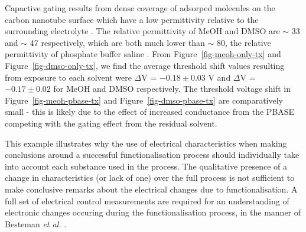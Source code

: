 \documentclass[
  a4paper,
]{scrbook}
\begin{document}
Capactive gating results from dense coverage of adsorped molecules on
the carbon nanotube surface which have a low permittivity relative to
the surrounding electrolyte \autocite{Heller2008}. The relative
permittivity of MeOH and DMSO are \(\sim\) 33 \autocite{Mohsen-Nia2010}
and \(\sim\) 47 \autocite{Hunger2010} respectively, which are both much
lower than \(\sim\) 80, the relative permittivity of phosphate buffer
saline \autocite{Salmanzadeh2013}. From Figure~\ref{fig-meoh-only-tx}
and Figure~\ref{fig-dmso-only-tx}, we find the average threshold shift
values resulting from exposure to each solvent were \(\Delta\)V =
\(-0.18 \pm 0.03\) V and \(\Delta\)V = \(-0.17 \pm 0.02\) for MeOH and
DMSO respectively. The threshold voltage shift in
Figure~\ref{fig-meoh-pbase-tx} and Figure~\ref{fig-dmso-pbase-tx} are
comparatively small - this is likely due to the effect of increased
conductance from the PBASE competing with the gating effect from the
residual solvent.

This example illustrates why the use of electrical characteristics when
making conclusions around a successful functionalisation process should
individually take into account each substance used in the process. The
qualitative presence of a change in characteristics (or lack of one)
over the full process is not sufficient to make conclusive remarks about
the electrical changes due to functionalisation. A full set of
electrical control measurements are required for an understanding of
electronic changes occuring during the functionalisation process, in the
manner of Besteman \emph{et al.} \autocite{Besteman2003}.

\newpage
{}

\hfill\break
\hfill\break
\hfill\break
\end{document}
